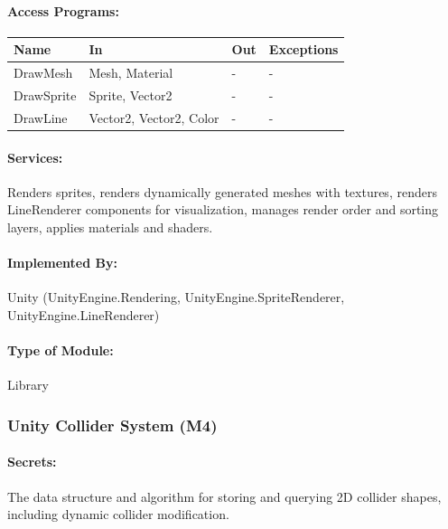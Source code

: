 \documentclass[12pt, titlepage]{article}
\begin{document}
\paragraph{Access Programs:}

\begin{center}
\begin{tabular}{p{2cm}p{5cm}p{2cm}p{4cm}}
\toprule
\textbf{Name} & \textbf{In} & \textbf{Out} & \textbf{Exceptions} \\
\midrule
DrawMesh & Mesh, Material & - & - \\
DrawSprite & Sprite, Vector2 & - & - \\
DrawLine & Vector2, Vector2, Color & - & - \\
\bottomrule
\end{tabular}
\end{center}

\paragraph{Services:}
Renders sprites, renders dynamically generated meshes with textures, renders LineRenderer components for visualization, manages render order and sorting layers, applies materials and shaders.

\paragraph{Implemented By:}
Unity (UnityEngine.Rendering, UnityEngine.SpriteRenderer,
\newline
UnityEngine.LineRenderer)

\paragraph{Type of Module:}
Library

\vspace{10mm}

\subsubsection{Unity Collider System (M4)} \label{M4}

\paragraph{Secrets:}
The data structure and algorithm for storing and querying 2D collider shapes, including dynamic collider modification.
\end{document}
